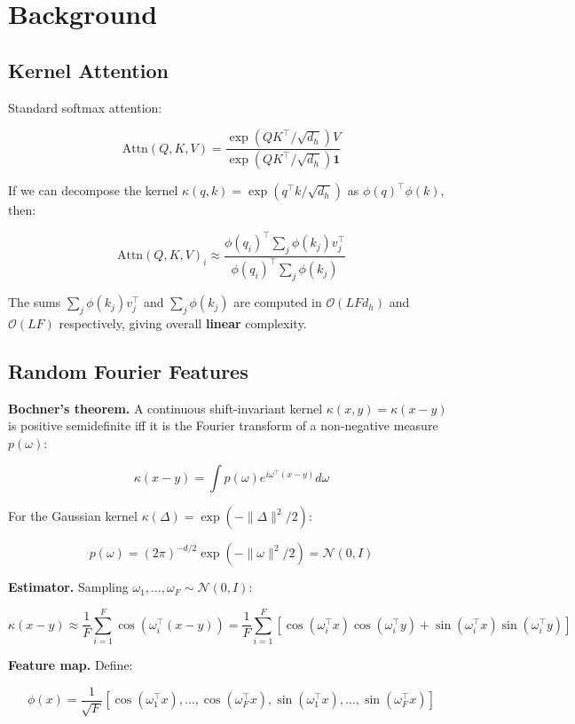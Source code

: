\section{Background}

\subsection{Kernel Attention}

Standard softmax attention:

\[
\text{Attn}(Q, K, V) = \frac{\exp(QK^\top / \sqrt{d_h}) V}{\exp(QK^\top / \sqrt{d_h}) \mathbf{1}}
\tag{3.1}
\]

If we can decompose the kernel $\kappa(q, k) = \exp(q^\top k / \sqrt{d_h})$ 
as $\phi(q)^\top \phi(k)$, then:

\[
\text{Attn}(Q, K, V)_i \approx \frac{\phi(q_i)^\top \sum_j \phi(k_j) v_j^\top}{\phi(q_i)^\top \sum_j \phi(k_j)}
\tag{3.2}
\]

The sums $\sum_j \phi(k_j) v_j^\top$ and $\sum_j \phi(k_j)$ are computed 
in $\mathcal{O}(L F d_h)$ and $\mathcal{O}(L F)$ respectively, giving 
overall \textbf{linear} complexity.

\subsection{Random Fourier Features}

\textbf{Bochner's theorem.} A continuous shift-invariant kernel 
$\kappa(x, y) = \kappa(x - y)$ is positive semidefinite iff it is the 
Fourier transform of a non-negative measure $p(\omega)$:

\[
\kappa(x - y) = \int p(\omega) e^{i \omega^\top (x - y)} d\omega
\tag{3.3}
\]

For the Gaussian kernel $\kappa(\Delta) = \exp(-\|\Delta\|^2 / 2)$:

\[
p(\omega) = (2\pi)^{-d/2} \exp(-\|\omega\|^2 / 2) = \mathcal{N}(0, I)
\tag{3.4}
\]

\textbf{Estimator.} Sampling $\omega_1, \dots, \omega_F \sim \mathcal{N}(0, I)$:

\[
\kappa(x - y) \approx \frac{1}{F} \sum_{i=1}^F \cos(\omega_i^\top (x - y))
= \frac{1}{F} \sum_{i=1}^F \left[\cos(\omega_i^\top x)\cos(\omega_i^\top y) + \sin(\omega_i^\top x)\sin(\omega_i^\top y)\right]
\tag{3.5}
\]

\textbf{Feature map.} Define:

\[
\phi(x) = \frac{1}{\sqrt{F}} [\cos(\omega_1^\top x), \dots, \cos(\omega_F^\top x), \sin(\omega_1^\top x), \dots, \sin(\omega_F^\top x)]
\tag{3.6}
\]


